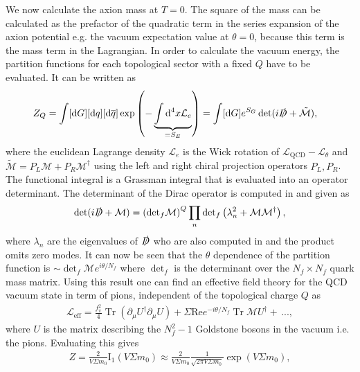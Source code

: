 \documentclass[twoside,a4paper, 12pt]{article}
\newcommand{\diff}{\mathrm{d}}
\DeclareMathOperator{\trace}{Tr}
\numberwithin{equation}{section}
\begin{document}
We now calculate the axion mass at $T = 0$.
The square of the mass can be calculated as the prefactor of the quadratic term in the series expansion of the axion potential e.g. the vacuum expectation value at $\theta = 0$, because this term is the mass term in the Lagrangian.
In order to calculate the vacuum energy, the partition functions for each topological sector with a fixed $Q$ have to be evaluated.
It can be written as
\begin{align*}
    Z_Q &= \int [\diff G] [\diff q] [\diff \overline{q}] \exp \left( - \underbrace{\int \diff^4 x \mathcal{L}_e}_{= S_E} \right)
     = \int [\diff G] e^{S_G} \det (i \slashed{D} + \tilde{\mathcal{M}}),
\end{align*}
where the euclidean Lagrange density $\mathcal{L}_e$ is the Wick rotation of $\mathcal{L}_\mathrm{QCD} - \mathcal{L}_\theta$
\cite[Sec. II, Eq. 2.8, 2.9]{Leutwyler:1992yt} and $\tilde{\mathcal{M}} = P_L \mathcal{M} + P_R \mathcal{M}^\dagger $ using the left and right chiral
projection operators $P_L, P_R$. The functional integral is a Grassman integral that is evaluated into an operator determinant.
The determinant of the Dirac operator is computed in \cite[Sec. II, Eq. 2.9]{Leutwyler:1992yt} and given as
\begin{align*}
    \det (i \slashed{D} + \mathcal{M}) = \left( \mathrm{det}_f \mathcal{M} \right)^Q \prod_n \mathrm{det}_f \left( \lambda_n^2 + \mathcal{M} \mathcal{M}^\dagger \right),
\end{align*}
where $\lambda_n$ are the eigenvalues of $\slashed{D}$ who are also computed in \cite{Leutwyler:1992yt}
and the product omits zero modes.
It can now be seen that the $\theta$ dependence of the partition function
is $\sim \det_f \mathcal{M} e^{i \theta / N_f}$
where $\det_f$ is the determinant over the $N_f \times N_f$ quark mass matrix.
Using this result one can find an effective field theory for the QCD vacuum state in term of pions, independent of the
topological charge $Q$ as \cite[Sec. VIII, Eq 8.4]{Leutwyler:1992yt}
\begin{align}
    \label{eq:L_eff}
    \mathcal{L}_\mathrm{eff} = \frac{f_\pi^2}{4} \trace ( \partial_\mu U^\dagger \partial_\mu U) + \Sigma \mathrm{Re} e^{-i \theta / N_f} \trace \mathcal{M} U^\dagger + \, ...,
\end{align}
where $U$ is the matrix describing the $N_f^2 - 1$ Goldstone bosons in the vacuum i.e. the pions.
Evaluating this gives \cite[Sec. VIII, Eq. 8.15]{Leutwyler:1992yt}
\begin{align*}
   Z  =  \frac{2}{V \Sigma m_0} \mathrm{I}_1 (V \Sigma m_0)
   \approx \frac{2}{V \Sigma m_0} \frac{1}{\sqrt{2 \pi V \Sigma m_0}} \exp (V \Sigma m_0),
\end{align*}
\end{document}
